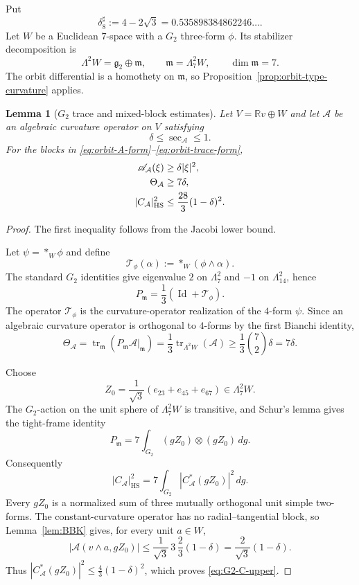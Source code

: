 \documentclass[reqno,11pt]{amsart}
\newtheorem{lemma}[theorem]{Lemma}
\theoremstyle{definition}
\newcommand{\cA}{\mathcal A}
\newcommand{\tr}{\operatorname{tr}}
\newcommand{\Id}{\operatorname{Id}}
\newcommand{\bbR}{\mathbb R}
\begin{document}
Put
\begin{equation*}
  \delta_8^\sharp:=4-2\sqrt3
  =0.535898384862246\ldots.
\end{equation*}
Let $W$ be a Euclidean $7$-space with a $G_2$ three-form $\phi$.  Its
stabilizer decomposition is
\begin{equation*}
  \Lambda^2W=\mathfrak g_2\oplus\mathfrak m,
  \qquad \mathfrak m=\Lambda^2_7W,
  \qquad \dim\mathfrak m=7.
\end{equation*}
The orbit differential is a homothety on $\mathfrak m$, so
Proposition~\ref{prop:orbit-type-curvature} applies.

\begin{lemma}[$G_2$ trace and mixed-block estimates]
\label{lem:G2-block-estimates}
Let $V=\bbR v\oplus W$ and let $\cA$ be an algebraic curvature operator on
$V$ satisfying
$$
  \delta\leq\sec_{\cA}\leq1.
$$
For the blocks in \eqref{eq:orbit-A-form}--\eqref{eq:orbit-trace-form},
\begin{align}
  \mathscr A_{\cA}(\xi)&\geq\delta|\xi|^2,
  \notag\\
  \Theta_{\cA}&\geq7\delta,
  \notag\\
  |C_{\cA}|_{\mathrm{HS}}^2
  &\leq\frac{28}{3}(1-\delta)^2.
  \label{eq:G2-C-upper}
\end{align}
\end{lemma}

\begin{proof}
The first inequality follows from the Jacobi lower bound.

Let $\psi=*_{W}\phi$ and define
$$
  \mathcal T_\phi(\alpha):=*_{W}(\phi\wedge\alpha).
$$
The standard $G_2$ identities give eigenvalue $2$ on $\Lambda^2_7$ and
$-1$ on $\Lambda^2_{14}$, hence
$$
  P_{\mathfrak m}=\frac13(\Id+\mathcal T_\phi).
$$
The operator $\mathcal T_\phi$ is the curvature-operator realization of the
$4$-form $\psi$.  Since an algebraic curvature operator is orthogonal to
$4$-forms by the first Bianchi identity,
$$
  \Theta_{\cA}
  =\tr_{\mathfrak m}(P_{\mathfrak m}\cA|_{\mathfrak m})
  =\frac13\tr_{\Lambda^2W}(\cA)
  \geq\frac13\binom72\delta=7\delta.
$$

Choose
$$
  Z_0=\frac1{\sqrt3}(e_{23}+e_{45}+e_{67})\in\Lambda^2_7W.
$$
The $G_2$-action on the unit sphere of $\Lambda^2_7W$ is transitive, and
Schur's lemma gives the tight-frame identity
$$
  P_{\mathfrak m}
  =7\int_{G_2}(gZ_0)\otimes(gZ_0)\,dg.
$$
Consequently
$$
  |C_{\cA}|_{\mathrm{HS}}^2
  =7\int_{G_2}|C_{\cA}^*(gZ_0)|^2\,dg.
$$
Every $gZ_0$ is a normalized sum of three mutually orthogonal unit simple
two-forms.  The constant-curvature operator has no radial--tangential
block, so Lemma~\ref{lem:BBK} gives, for every unit $a\in W$,
$$
  |\cA(v\wedge a,gZ_0)|
  \leq\frac1{\sqrt3}\,3\,\frac23(1-\delta)
  =\frac2{\sqrt3}(1-\delta).
$$
Thus $|C_{\cA}^*(gZ_0)|^2\leq\frac43(1-\delta)^2$, which proves
\eqref{eq:G2-C-upper}.
\end{proof}
\end{document}
